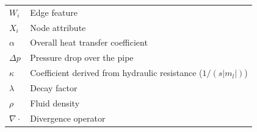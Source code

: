 \documentclass[energies,article,submit,pdftex,moreauthors]{Definitions/mdpi}
\begin{document}
{\begin{tabular}{@{}ll}
		$W_i$          & Edge feature                                                 \\
		$X_i$          & Node attribute                                               \\
		$\alpha$       & Overall heat transfer coefficient                            \\
		$\Delta p$     & Pressure drop over the pipe                                  \\
		$\kappa$       & Coefficient derived from hydraulic resistance ($1/(s|m_l|)$) \\
		$\lambda$      & Decay factor                                                 \\
		$\rho$         & Fluid density                                                \\
		$\nabla \cdot$ & Divergence operator                                          \\
	\end{tabular}
}


\end{document}
